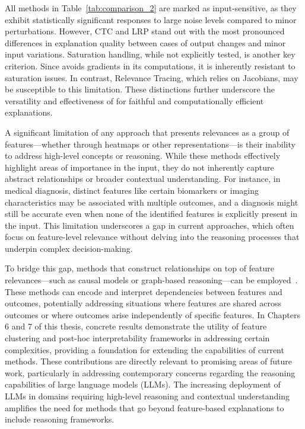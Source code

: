 All methods in Table~\ref{tab:comparison_2} are marked as input-sensitive, as they exhibit statistically significant responses to large noise levels compared to minor perturbations. However, CTC and LRP stand out with the most pronounced differences in explanation quality between cases of output changes and minor input variations. Saturation handling, while not explicitly tested, is another key criterion. Since \CTC\/ avoids gradients in its computations, it is inherently resistant to saturation issues. In contrast, Relevance Tracing, which relies on Jacobians, may be susceptible to this limitation. These distinctions further underscore the versatility and effectiveness of \CTC\/ for faithful and computationally efficient explanations.

A significant limitation of any approach that presents relevances as a group of features—whether through heatmaps or other representations—is their inability to address high-level concepts or reasoning. While these methods effectively highlight areas of importance in the input, they do not inherently capture abstract relationships or broader contextual understanding. For instance, in medical diagnosis, distinct features like certain biomarkers or imaging characteristics may be associated with multiple outcomes, and a diagnosis might still be accurate even when none of the identified features is explicitly present in the input. This limitation underscores a gap in current approaches, which often focus on feature-level relevance without delving into the reasoning processes that underpin complex decision-making.

To bridge this gap, methods that construct relationships on top of feature relevances—such as causal models or graph-based reasoning—can be employed~\cite{abs-1911-10500, heinzedeml2017causalstructurelearning, DBLP:journals/corr/abs-1904-12584}. These methods can encode and interpret dependencies between features and outcomes, potentially addressing situations where features are shared across outcomes or where outcomes arise independently of specific features. In Chapters 6 and 7 of this thesis, concrete results demonstrate the utility of feature clustering and post-hoc interpretability frameworks in addressing certain complexities, providing a foundation for extending the capabilities of current methods. These contributions are directly relevant to promising areas of future work, particularly in addressing contemporary concerns regarding the reasoning capabilities of large language models (LLMs). The increasing deployment of LLMs in domains requiring high-level reasoning and contextual understanding amplifies the need for methods that go beyond feature-based explanations to include reasoning frameworks.

